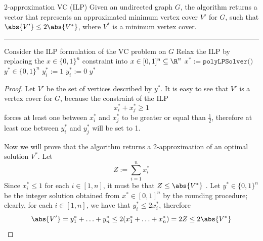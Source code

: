 \documentclass[a4paper, 12pt]{report}
\begin{document}
    \begin{framedalgo}{2-approximation VC (ILP)}
        Given an undirected graph $G$, the algorithm returns a vector that represents an approximated minimum vertex cover $V'$ for $G$, such that $\abs{V'} \le 2 \abs {V^*}$, where $V^*$ is a minimum vertex cover. \\
        \hrule

        \quad
        \label{alg:2-approx_vc_ilp}
        \begin{algorithmic}[1]
                \State Consider the ILP formulation of the VC problem on $G$
                \State Relax the ILP by replacing the $x \in \{0, 1\}^n$ constraint into $x \in [0, 1]^n \subseteq \R^n$
                \State $x^* := \texttt{polyLPSolver()}$
                \State $y^* \in \{0, 1\}^n$
                        \State $y_i^* := 1$
                    \Else
                        \State $y_i^* := 0$
                    \EndIf
                \EndFor
                \State {} $y^*$
            \EndFunction
        \end{algorithmic}
    \end{framedalgo}


    \begin{proof}
        Let $V'$ be the set of vertices described by $y^*$. It is easy to see that $V'$ is a vertex cover for $G$, because the constraint of the ILP $$x^*_i + x^*_j \ge 1$$ forces at least one between $x^*_i$ and $x^*_j$ to be greater or equal than $\frac{1}{2}$, therefore at least one between $y^*_i$ and $y_j^*$ will be set to 1.

        Now we will prove that the algorithm returns a 2-approximation of an optimal solution $V^*$. Let $$Z := \sum_{i = 1}^n{x^*_i}$$ Since $x^*_i \le 1$ for each $i \in [1, n]$, it must be that $Z \le \abs{V^*}$ . Let $y^* \in \{0, 1\}^n$ be the integer solution obtained from $x^* \in [0, 1]^n$ by the rounding procedure; clearly, for each $i \in [1, n]$, we have that $y^*_i \le 2x^*_i$, therefore $$\abs{V'} = y^*_1 + \ldots + y^*_n \le 2 (x^*_1 + \ldots + x^*_n) = 2Z \le 2 \abs{V^*}$$
    \end{proof}
\end{document}
